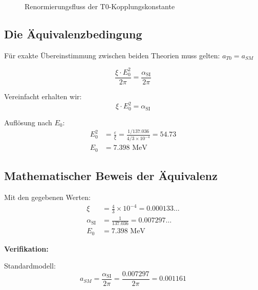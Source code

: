 \documentclass[12pt,a4paper]{article}
\numberwithin{equation}{section}
\newcommand{\xipar}{\xi}
\newcommand{\epsilonT}{\varepsilon}
\newcommand{\alphaSI}{\alpha_{\text{SI}}}
\newcommand{\Eo}{E_0}
\begin{document}
	\begin{figure}[h]
		\centering
		\caption{Renormierungsfluss der T0-Kopplungskonstante}
		\label{fig:renormalization_flow}
	\end{figure}
	
	\subsection{Die Äquivalenzbedingung}
	
	Für exakte Übereinstimmung zwischen beiden Theorien muss gelten: $a_{T0} = a_{SM}$
	
	\begin{equation}
		\frac{\xipar \cdot \Eo^2}{2\pi} = \frac{\alphaSI}{2\pi}
		\label{eq:equivalence_condition}
	\end{equation}
	
	Vereinfacht erhalten wir:
	\begin{equation}
		\xipar \cdot \Eo^2 = \alphaSI
		\label{eq:simplified_equivalence}
	\end{equation}
	
	Auflösung nach $\Eo$:
	\begin{align}
		\Eo^2 &= \frac{ \epsilonT}{\xipar} = \frac{1/137.036}{4/3 \times 10^{-4}} = 54.73\\
		\Eo &= 7.398 \text{ MeV}
	\end{align}
	
	\subsection{Mathematischer Beweis der Äquivalenz}
	
	Mit den gegebenen Werten:
	\begin{align}
		\xipar &= \frac{4}{3} \times 10^{-4} = 0.000133\ldots\\
		\alphaSI &= \frac{1}{137.036} = 0.007297\ldots\\
		\Eo &= 7.398 \text{ MeV}
	\end{align}
	
	\textbf{Verifikation:}
	
	Standardmodell:
	\begin{equation}
		a_{SM} = \frac{\alphaSI}{2\pi} = \frac{0.007297}{2\pi} = 0.001161
	\end{equation}
	
\end{document}
